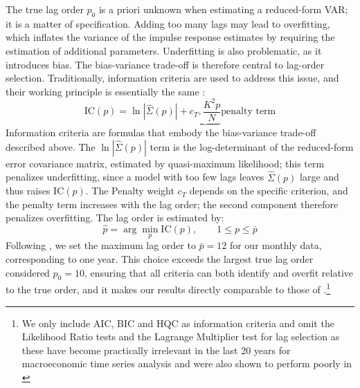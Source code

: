 \documentclass[12pt, a4paper]{article}
\begin{document}
The true lag order $p_0$ is a priori unknown when estimating a reduced-form VAR; it is a matter of specification. Adding too many lags may lead to overfitting, which inflates the variance of the impulse response estimates by requiring the estimation of additional parameters. Underfitting is also problematic, as it introduces bias. The bias-variance trade-off is therefore central to lag-order selection. Traditionally, information criteria are used to address this issue, and their working principle is essentially the same \citep[chap.~4]{lutkepohlNewIntroductionMultiple2005}:
\begin{equation} \label{eq:IC}
\mathrm{IC}(p) = \ln{|\hat{\Sigma}(p)|} + \underbrace{c_T ,\frac{K^2 p}{N}}{\text{penalty term}}
\end{equation}
Information criteria are formulas that embody the bias-variance trade-off described above. The $\ln|\hat{\Sigma}(p)|$ term is the log-determinant of the reduced-form error covariance matrix, estimated by quasi-maximum likelihood; this term penalizes underfitting, since a model with too few lags leaves $\hat \Sigma(p)$ large and thus raises $\mathrm{IC}(p)$. The Penalty weight $c_T$ depends on the specific criterion, and the penalty term increases with the lag order; the second component therefore penalizes overfitting. The lag order is estimated by:
\begin{equation} \label{eq:lag_selection}
\hat{p} = \arg\min_{p} \mathrm{IC}(p), \qquad 1 \leq p \leq \bar{p}
\end{equation}
Following \citet{ivanovPractitionersGuideLag2005}, we set the maximum lag order to $\bar{p}=12$ for our monthly data, corresponding to one year. This choice exceeds the largest true lag order considered $p_0 = 10$, ensuring that all criteria can both identify and overfit relative to the true order, and it makes our results directly comparable to those of \citet{ivanovPractitionersGuideLag2005}.\footnote{We only include AIC, BIC and HQC as information criteria and omit the Likelihood Ratio tests and the Lagrange Multiplier test for lag selection as these have become practically irrelevant in the last 20 years for macroeconomic time series analysis and were also shown to perform poorly in \citet{ivanovPractitionersGuideLag2005}}
\end{document}
